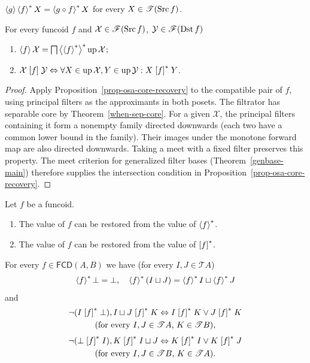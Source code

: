 \begin{obvious}
$\left\langle g\right\rangle\left\langle f\right\rangle ^{\ast}X=\left\langle g\circ f\right\rangle ^{\ast}X$ for every $X\in\mathscr{T}(\operatorname{Src}
f)$.\end{obvious}
\begin{thm}
For every funcoid $f$ and $\mathcal{X}\in\mathscr{F}(\operatorname{Src} f)$,
$\mathcal{Y}\in\mathscr{F}(\operatorname{Dst} f)$
\begin{enumerate}
\item \label{f-filt-x}$\left\langle f\right\rangle\mathcal{X}=\bigsqcap\left\langle \left\langle f\right\rangle ^{\ast}\right\rangle ^{\ast}\operatorname{up}\mathcal{X}$;
\item \label{frel-filt}$\mathcal{X}\mathrel{\left[f\right]}\mathcal{Y}\Leftrightarrow\forall
X\in\operatorname{up}\mathcal{X},Y\in\operatorname{up}\mathcal{Y}:X\mathrel{\left[f\right]^{\ast}}Y$.
\end{enumerate}
\end{thm}
\begin{proof}
Apply Proposition~\ref{prop-osa-core-recovery} to the compatible
pair of $f$, using principal filters as the approximants in both
posets. The filtrator has separable core by
Theorem~\ref{when-sep-core}. For a given $\mathcal X$, the principal
filters containing it form a nonempty family directed downwards
(each two have a common lower bound in the family).
Their images under the monotone forward map are also directed
downwards. Taking a meet with a fixed filter preserves this
property. The meet criterion for generalized filter bases
(Theorem~\ref{genbase-main}) therefore supplies the intersection
condition in Proposition~\ref{prop-osa-core-recovery}.
\end{proof}
\begin{cor}
Let $f$ be a funcoid.
\begin{enumerate}
\item The value of $f$ can be restored from the value of $\left\langle f\right\rangle ^{\ast}$.
\item The value of $f$ can be restored from the value of $\mathrel{\left[f\right]^{\ast}}$.
\end{enumerate}
\end{cor}
\begin{prop}
For every $f\in\mathsf{FCD}(A,B)$ we have (for every $I,J\in\mathscr{T}A$)
\[
\left\langle f\right\rangle ^{\ast}\bot=\bot,\quad\left\langle f\right\rangle ^{\ast}(I\sqcup
J)=\left\langle f\right\rangle ^{\ast}I\sqcup\left\langle f\right\rangle ^{\ast}J
\]
and
\begin{multline*}
\lnot(I \mathrel{\left[f\right]^{\ast}}\bot), I\sqcup J\mathrel{\left[f\right]^{\ast}}K
\Leftrightarrow I\mathrel{\left[f\right]^{\ast}}K\lor J\mathrel{\left[f\right]^{\ast}}K \\
\text{(for every \ensuremath{I,J\in\mathscr{T}A}, \ensuremath{K\in\mathscr{T}B})},
\end{multline*}
\begin{multline*}
\lnot(\bot \mathrel{\left[f\right]^{\ast}}I), K\mathrel{\left[f\right]^{\ast}}I\sqcup J
\Leftrightarrow K\mathrel{\left[f\right]^{\ast}}I\lor K\mathrel{\left[f\right]^{\ast}}J \\
\text{(for every \ensuremath{I,J\in\mathscr{T}B}, \ensuremath{K\in\mathscr{T}A})}.
\end{multline*}
\end{prop}
